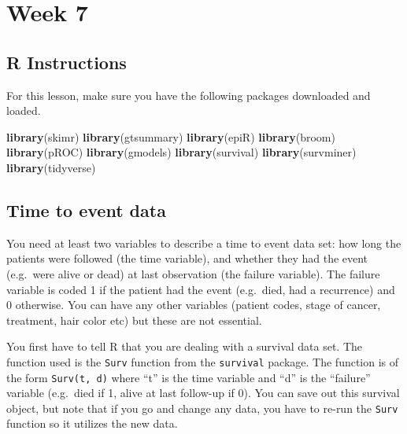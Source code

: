 \documentclass[]{book}
\newenvironment{Shaded}{\begin{snugshade}}{\end{snugshade}}
\newcommand{\KeywordTok}[1]{\textcolor[rgb]{0.13,0.29,0.53}{\textbf{#1}}}
\newcommand{\NormalTok}[1]{#1}
\begin{document}
\hypertarget{week-7}{%
\chapter{Week 7}\label{week-7}}

\hypertarget{r-instructions-6}{%
\section{R Instructions}\label{r-instructions-6}}

For this lesson, make sure you have the following packages downloaded
and loaded.

\begin{Shaded}
\begin{Highlighting}[]
\KeywordTok{library}\NormalTok{(skimr)}
\KeywordTok{library}\NormalTok{(gtsummary)}
\KeywordTok{library}\NormalTok{(epiR)}
\KeywordTok{library}\NormalTok{(broom)}
\KeywordTok{library}\NormalTok{(pROC)}
\KeywordTok{library}\NormalTok{(gmodels)}
\KeywordTok{library}\NormalTok{(survival)}
\KeywordTok{library}\NormalTok{(survminer)}
\KeywordTok{library}\NormalTok{(tidyverse)}
\end{Highlighting}
\end{Shaded}

\hypertarget{time-to-event-data}{%
\section{Time to event data}\label{time-to-event-data}}

You need at least two variables to describe a time to event data set:
how long the patients were followed (the time variable), and whether
they had the event (e.g.~were alive or dead) at last observation (the
failure variable). The failure variable is coded 1 if the patient had
the event (e.g.~died, had a recurrence) and 0 otherwise. You can have
any other variables (patient codes, stage of cancer, treatment, hair
color etc) but these are not essential.

You first have to tell R that you are dealing with a survival data set.
The function used is the \texttt{Surv} function from the
\texttt{survival} package. The function is of the form
\texttt{Surv(t,\ d)} where ``t'' is the time variable and ``d'' is the
``failure'' variable (e.g.~died if 1, alive at last follow-up if 0). You
can save out this survival object, but note that if you go and change
any data, you have to re-run the \texttt{Surv} function so it utilizes
the new data.
\end{document}
